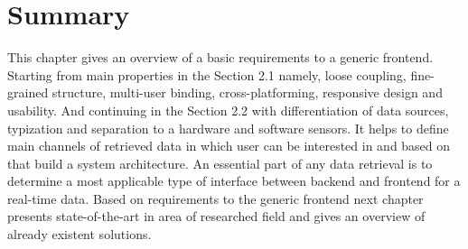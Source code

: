 \section{Summary}
	This chapter gives an overview of a basic requirements to a generic frontend. Starting from main properties in the Section 2.1 namely, loose coupling, fine-grained structure, multi-user binding, cross-platforming, responsive design and usability. And continuing in the Section 2.2 with differentiation of data sources, typization and separation to a hardware and software sensors. It helps to define main channels of retrieved data in which user can be interested in and based on that build a system architecture. An essential part of any data retrieval is to determine a most applicable type of interface between backend and frontend for a real-time data. Based on requirements to the generic frontend next chapter presents state-of-the-art in area of researched field and gives an overview of already existent solutions.
